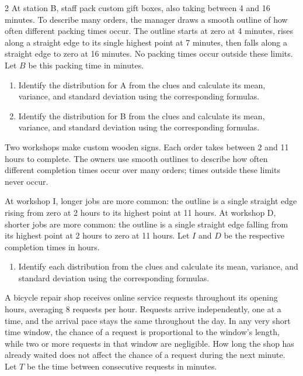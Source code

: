 \begin{multicols}{2}
At station B, staff pack custom gift boxes, also taking between 4 and 16
minutes. To describe many orders, the manager draws a smooth outline of how
often different packing times occur. The outline starts at zero at 4 minutes,
rises along a straight edge to its single highest point at 7 minutes, then
falls along a straight edge to zero at 16 minutes. No packing times occur
outside these limits. Let $B$ be this packing time in minutes.
\begin{enumerate}[label=\textbf{(\alph*)}]
\item Identify the distribution for A from the clues and calculate its mean, variance, and standard deviation using the corresponding formulas. 
\item Identify the distribution for B from the clues and calculate its mean, variance, and standard deviation using the corresponding formulas. 
\end{enumerate}

Two workshops make custom wooden signs. Each order takes between 2 and
11 hours to complete. The owners use smooth outlines to describe how often
different completion times occur over many orders; times outside these limits
never occur.

At workshop I, longer jobs are more common: the outline is a single straight
edge rising from zero at 2 hours to its highest point at 11 hours.
At workshop D, shorter jobs are more common: the outline is a single straight
edge falling from its highest point at 2 hours to zero at 11 hours.
Let $I$ and $D$ be the respective completion times in hours.
\begin{enumerate}[label=\textbf{(\alph*)}]
\item Identify each distribution from the clues and calculate its mean, variance, and standard deviation using the corresponding formulas. 
\end{enumerate}

\newpage

A bicycle repair shop receives online service requests throughout its opening
hours, averaging 8 requests per hour. Requests arrive independently, one at
a time, and the arrival pace stays the same throughout the day. In any very
short time window, the chance of a request is proportional to the window's
length, while two or more requests in that window are negligible. How long
the shop has already waited does not affect the chance of a request during
the next minute. Let $T$ be the time between consecutive requests in minutes.


\end{multicols}
